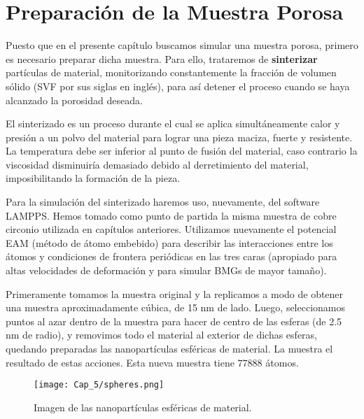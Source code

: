 
\section{Preparación de la Muestra Porosa}
\label{S5_3}

Puesto que en el presente capítulo buscamos simular una muestra porosa, primero es necesario preparar dicha muestra. Para ello,
trataremos de \textbf{sinterizar} partículas de material, monitorizando constantemente la fracción de volumen sólido (SVF
por sus siglas en inglés), para así detener el proceso cuando se haya alcanzado la porosidad deseada.

El sinterizado es un proceso durante el cual se aplica simultáneamente calor y presión a un polvo
del material para lograr una pieza maciza, fuerte y resistente. La temperatura debe ser inferior al punto de fusión del material,
caso contrario la viscosidad disminuiría demasiado debido al derretimiento del material, imposibilitando la formación de la pieza.

Para la simulación del sinterizado haremos uso, nuevamente, del software LAMPPS. Hemos tomado como punto de partida la misma muestra
de cobre circonio utilizada en capítulos anteriores. Utilizamos nuevamente el potencial EAM (método de átomo embebido) \citep{daw84}
para describir las interacciones entre los átomos y condiciones de frontera periódicas en las tres caras (apropiado para altas velocidades
de deformación \citep{bringa05} y para simular BMGs de mayor tamaño).

Primeramente tomamos la muestra original y la replicamos a modo de obtener una muestra aproximadamente cúbica, de 15 nm de lado. 
Luego, seleccionamos puntos
al azar dentro de la muestra para hacer de centro de las esferas (de 2.5 nm de radio), y removimos todo el material al exterior de dichas esferas,
quedando preparadas las nanopartículas esféricas de material. La  muestra el resultado de estas
acciones. Esta nueva muestra tiene 77888 átomos.

\begin{figure}[h!]
  \centering
  \texttt{[image: Cap\_5/spheres.png]}
  \caption[Nanopartículas esféricas de material para el sinterizado]{Imagen de las nanopartículas esféricas de material.}
  \label{C5:fg:sintInicial}
\end{figure}

